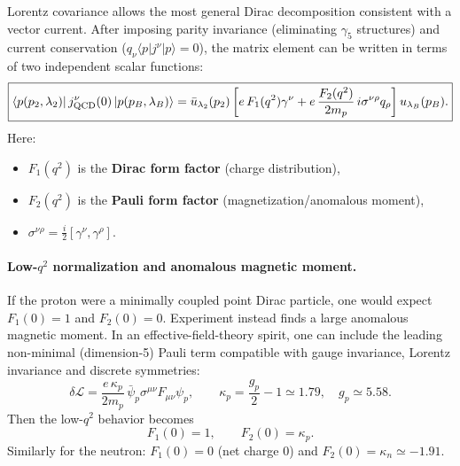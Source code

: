 Lorentz covariance allows the most general Dirac decomposition consistent with a vector current.
After imposing parity invariance (eliminating $\gamma_5$ structures) and current conservation
($q_\nu \langle p|j^\nu|p\rangle=0$), the matrix element can be written in terms of two
independent scalar functions:
\begin{equation}
\boxed{
\langle p(p_2,\lambda_2)|\,j^\nu_{\rm QCD}(0)\,|p(p_B,\lambda_B)\rangle
= \bar u_{\lambda_2}(p_2)\left[
e\,F_1(q^2)\gamma^\nu
+ e\,\frac{F_2(q^2)}{2m_p}\,i\sigma^{\nu\rho}q_\rho
\right]u_{\lambda_B}(p_B).
}
\label{eq:dirac-pauli-ff}
\end{equation}
Here:
\begin{itemize}
  \item $F_1(q^2)$ is the \textbf{Dirac form factor} (charge distribution),
  \item $F_2(q^2)$ is the \textbf{Pauli form factor} (magnetization/anomalous moment),
  \item $\sigma^{\nu\rho}=\frac{i}{2}[\gamma^\nu,\gamma^\rho]$.
\end{itemize}

\paragraph{Low-$q^2$ normalization and anomalous magnetic moment.}
If the proton were a minimally coupled point Dirac particle, one would expect
$F_1(0)=1$ and $F_2(0)=0$. Experiment instead finds a large anomalous magnetic moment.
In an effective-field-theory spirit, one can include the leading non-minimal (dimension-5)
Pauli term compatible with gauge invariance, Lorentz invariance and discrete symmetries:
\begin{equation}
\delta\mathcal L
= \frac{e\,\kappa_p}{2m_p}\,\bar\psi_p \sigma^{\mu\nu}F_{\mu\nu}\psi_p,
\qquad \kappa_p=\frac{g_p}{2}-1 \simeq 1.79,\quad g_p\simeq 5.58.
\end{equation}
Then the low-$q^2$ behavior becomes
\begin{equation}
F_1(0)=1,\qquad F_2(0)=\kappa_p.
\end{equation}
Similarly for the neutron: $F_1(0)=0$ (net charge $0$) and $F_2(0)=\kappa_n\simeq -1.91$.

